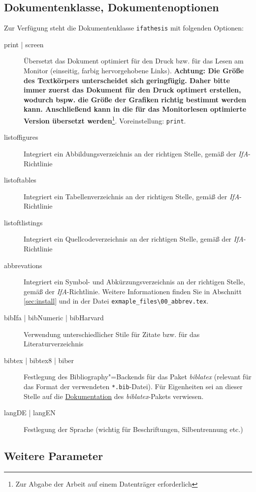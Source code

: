 \subsection{Dokumentenklasse, Dokumentenoptionen}

Zur Verfügung steht die Dokumentenklasse \verb-ifathesis- mit folgenden Optionen:

\begin{description}
  \item[print | screen] Übersetzt das Dokument optimiert für den Druck bzw. für das Lesen am Monitor (einseitig, farbig hervorgehobene Links). \textbf{Achtung: Die Größe des Textkörpers unterscheidet sich geringfügig. Daher bitte immer zuerst das Dokument für den Druck optimert erstellen, wodurch bspw. die Größe der Grafiken richtig bestimmt werden kann. Anschließend kann in die für das Monitorlesen optimierte Version übersetzt werden}\footnote{Zur Abgabe der Arbeit auf einem Datenträger erforderlich}. Voreinstellung: \verb-print-.
  \item[listoffigures] Integriert ein Abbildungsverzeichnis an der richtigen Stelle, gemäß der \emph{IfA}-Richtlinie
  \item[listoftables] Integriert ein Tabellenverzeichnis an der richtigen Stelle, gemäß der \emph{IfA}-Richtlinie
  \item[listoftlistings] Integriert ein Quellcodeverzeichnis an der richtigen Stelle, gemäß der \emph{IfA}-Richtlinie
  \item[abbrevations] Integriert ein Symbol- und Abkürzungsverzeichnis an der richtigen Stelle, gemäß der \emph{IfA}-Richtlinie. Weitere Informationen finden Sie in Abschnitt \ref{sec:install} und in der Datei \verb-exmaple_files\00_abbrev.tex-.
  \item[bibIfa | bibNumeric | bibHarvard] Verwendung unterschiedlicher Stile für
  Zitate bzw. für das Literaturverzeichnis
  \item[bibtex | bibtex8 | biber] Festlegung des Bibliography"=Backends für das Paket \emph{biblatex} (relevant für das Format der verwendeten \texttt{*.bib}-Datei). Für Eigenheiten sei an dieser Stelle auf die \href{https://www.ctan.org/pkg/biblatex?lang=de}{Dokumentation} des \emph{biblatex}-Pakets verwiesen.
  \item[langDE | langEN] Festlegung der Sprache (wichtig für Beschriftungen, Silbentrennung etc.)
\end{description}


\subsection{Weitere Parameter}

